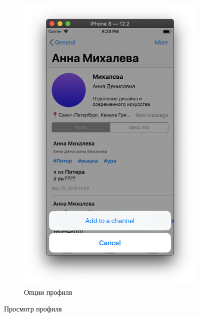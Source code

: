 \documentclass[a4paper,12pt]{article}
\begin{document}
\begin{figure}[h!]
\begin{subfigure}[b]{0.3\linewidth}
			\includegraphics[width=\linewidth]{../includes/pmi/otherprofile_functions.png}
			\caption{\label{pic: otherpr} Опции профиля}
		\end{subfigure}
		
		\caption{\label{pic: myprofile} Просмотр профиля}
	\end{figure}
\clearpage
\end{document}
